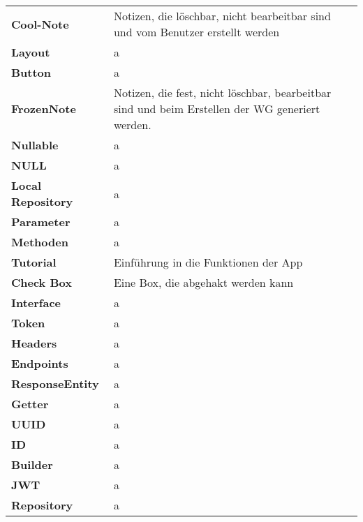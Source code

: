   \begin{table}[h!]
		
			\label{my-label}
			\begin{tabular}{p{4cm}p{10cm}}
				\textbf{Cool-Note} & Notizen, die löschbar, nicht bearbeitbar sind und vom Benutzer erstellt werden   \\
				\textbf{Layout} & a  \\
				
				\textbf{Button} & a\\
				\textbf{FrozenNote} & Notizen, die fest, nicht löschbar, bearbeitbar sind und beim Erstellen der WG generiert werden.   \\
				\textbf{Nullable} & a  \\
				\textbf{NULL} & a  \\
				\textbf{Local Repository} & a  \\
				\textbf{Parameter} & a  \\
				\textbf{Methoden} & a  \\
				\textbf{Tutorial} &  Einführung in die Funktionen der App
   \\
				\textbf{Check Box} &  Eine Box, die abgehakt werden kann \\
				\textbf{Interface} & a  \\
				\textbf{Token} & a  \\
				\textbf{Headers} & a  \\
				\textbf{Endpoints} & a  \\
				\textbf{ResponseEntity} & a  \\	
				\textbf{Getter} & a  \\	
				\textbf{UUID} &a   \\	
				\textbf{ID} &  a \\	
				\textbf{Builder} &  a \\	
				\textbf{JWT} &  a \\	
				\textbf{Repository} &  a \\	
				
			\end{tabular}
		\end{table}